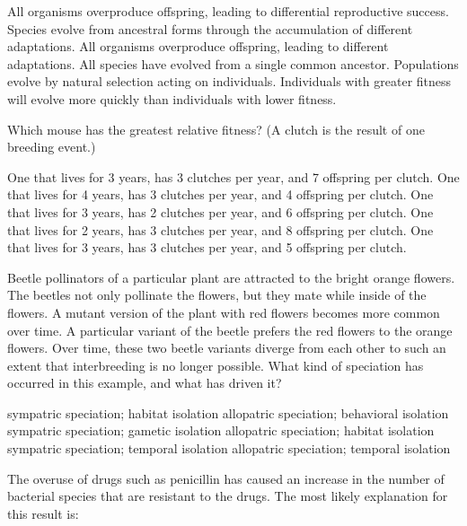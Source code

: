 \begin{choices}
\choice All organisms overproduce offspring, leading to differential reproductive success. 
\correctchoice Species evolve from ancestral forms through the accumulation of different adaptations. 
\choice All organisms overproduce offspring, leading to different adaptations. 
\choice All species have evolved from a single common ancestor. 
\choice Populations evolve by natural selection acting on individuals. 
\choice Individuals with greater fitness will evolve more quickly than individuals with lower fitness. 
\end{choices}

\question
Which mouse has the greatest relative fitness? (A clutch is the result of one breeding event.)

\begin{choices}
\correctchoice One that lives for 3 years, has 3 clutches per year, and 7 offspring per clutch. 
\choice One that lives for 4 years, has 3 clutches per year, and 4 offspring per clutch.
\choice One that lives for 3 years, has 2 clutches per year, and 6 offspring per clutch. 
\choice One that lives for 2 years, has 3 clutches per year, and 8 offspring per clutch. 
\choice One that lives for 3 years, has 3 clutches per year, and 5 offspring per clutch.
\end{choices}

\question
Beetle pollinators of a particular plant are attracted to the bright orange flowers. The beetles not only pollinate the flowers, but they mate while inside of the flowers. A mutant version of the plant with red flowers becomes more common over time. A particular variant of the beetle prefers the red flowers to the orange flowers. Over time, these two beetle variants diverge from each other to such an extent that interbreeding is no longer possible. What kind of speciation has occurred in this example, and what has driven it?

\begin{choices}
\correctchoice sympatric speciation; habitat isolation
\choice allopatric speciation; behavioral isolation
\choice sympatric speciation; gametic isolation
\choice allopatric speciation; habitat isolation
\choice sympatric speciation; temporal isolation
\choice allopatric speciation; temporal isolation
\end{choices}

\question
The overuse of drugs such as penicillin has caused an increase in the number of bacterial species that are resistant to the drugs. The most likely explanation for this result is:

